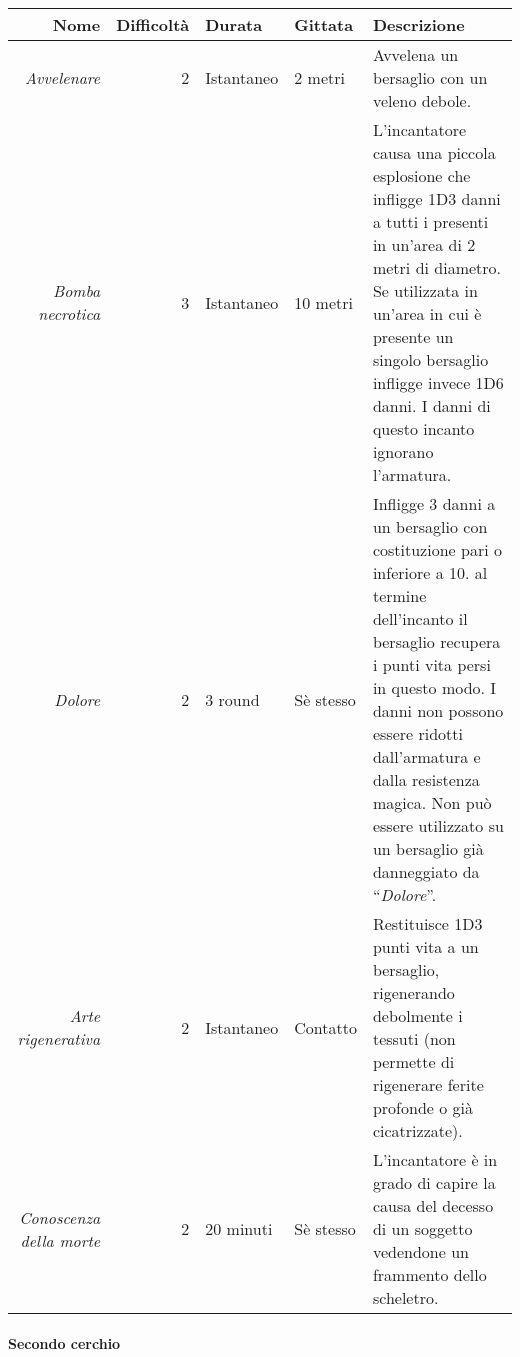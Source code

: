 \documentclass[../manuale_main.tex]{subfiles}
\begin{document}
\begin{tabularx}{\linewidth}{|N| D| T| G| Y|}
\hline
\textbf{Nome} & \textbf{Difficoltà} & \textbf{Durata} & \textbf{Gittata} & \textbf{Descrizione} \\ \hline\hline
\textit{Avvelenare} & 2 & Istantaneo & 2 metri &Avvelena un bersaglio con un veleno debole.  \\ \hline
\textit{Bomba necrotica} & 3 &Istantaneo  & 10 metri  & L'incantatore causa una piccola esplosione che infligge 1D3 danni a tutti i presenti in un'area di 2 metri di diametro. Se utilizzata in un’area in cui è presente un singolo bersaglio infligge invece 1D6 danni. I danni di questo incanto ignorano l'armatura.\\ \hline
\textit{Dolore} & 2 & 3 round & Sè stesso & Infligge 3 danni a un bersaglio con costituzione pari o inferiore a 10. al termine dell'incanto il bersaglio recupera i punti vita persi in questo modo. I danni non possono essere ridotti dall'armatura e dalla resistenza magica. Non può essere utilizzato su un bersaglio già danneggiato da “\emph{Dolore}”.  \\ \hline
\textit{Arte rigenerativa} & 2  & Istantaneo & Contatto &Restituisce 1D3 punti vita a un bersaglio, rigenerando debolmente i tessuti (non permette di rigenerare ferite profonde o già cicatrizzate).\\ \hline
\textit{Conoscenza della morte} & 2 & 20 minuti & Sè stesso & L'incantatore è in grado di capire la causa del decesso di un soggetto vedendone un frammento dello scheletro. \\
\hline
\end{tabularx}


\clearpage


\paragraph{Secondo cerchio}\mbox{}\\
\end{document}
